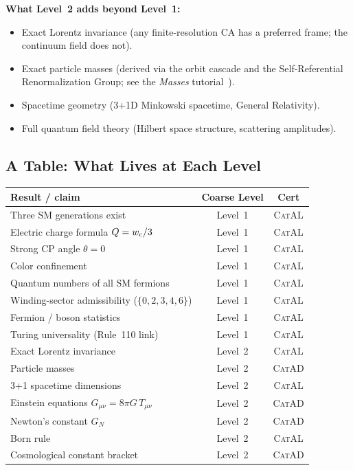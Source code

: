 \documentclass[11pt,a4paper]{article}
\newcommand{\CatAL}{\textsc{CatAL}}
\newcommand{\CatAD}{\textsc{CatAD}}
\begin{document}
\medskip
\textbf{What Level~2 adds beyond Level~1:}
\begin{itemize}[itemsep=4pt]
  \item Exact Lorentz invariance (any finite-resolution CA has a preferred
    frame; the continuum field does not).
  \item Exact particle masses (derived via the orbit cascade and the
    Self-Referential Renormalization Group; see the \emph{Masses} tutorial~\cite{SpivackTutorialMasses}).
  \item Spacetime geometry (3+1D Minkowski spacetime, General Relativity).
  \item Full quantum field theory (Hilbert space structure, scattering
    amplitudes).
\end{itemize}

\subsection{A Table: What Lives at Each Level}

\bigskip
\begin{center}
\begin{tabular}{@{}p{5.5cm}cc@{}}
\toprule
\textbf{Result / claim} & \textbf{Coarse Level} & \textbf{Cert} \\
\midrule
Three SM generations exist & Level~1 & \CatAL \\
Electric charge formula $Q = w_{\rm c}/3$ & Level~1 & \CatAL \\
Strong CP angle $\theta = 0$ & Level~1 & \CatAL \\
Color confinement & Level~1 & \CatAL \\
Quantum numbers of all SM fermions & Level~1 & \CatAL \\
Winding-sector admissibility ($\{0,2,3,4,6\}$) & Level~1 & \CatAL \\
Fermion / boson statistics & Level~1 & \CatAL \\
Turing universality (Rule~110 link) & Level~1 & \CatAL \\
\midrule
Exact Lorentz invariance & Level~2 & \CatAL \\
Particle masses & Level~2 & \CatAD \\
3+1 spacetime dimensions & Level~2 & \CatAL \\
Einstein equations $G_{\mu\nu} = 8\pi G\,T_{\mu\nu}$ & Level~2 & \CatAD \\
Newton's constant $G_N$ & Level~2 & \CatAD \\
Born rule & Level~2 & \CatAL \\
Cosmological constant bracket & Level~2 & \CatAD \\
\bottomrule
\end{tabular}
\end{center}
\bigskip
\end{document}
